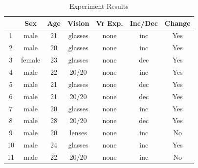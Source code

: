 \documentclass[tog]{acmsiggraph}
\begin{document}
\begin{table}[H]
	\centering
	\caption{Experiment Results}
	\label{The results}
	\begin{tabular}{@{}ccccccc@{}}
		\toprule
		& Sex                         & Age                     & Vision                       & Vr Exp.                   & Inc/Dec                  & Change                   \\ \midrule
		\multicolumn{1}{|c|}{1}  & \multicolumn{1}{c|}{male}   & \multicolumn{1}{c|}{21} & \multicolumn{1}{c|}{glasses} & \multicolumn{1}{c|}{none} & \multicolumn{1}{c|}{inc} & \multicolumn{1}{c|}{Yes} \\ \midrule
		\multicolumn{1}{|c|}{2}  & \multicolumn{1}{c|}{male}   & \multicolumn{1}{c|}{20} & \multicolumn{1}{c|}{glasses} & \multicolumn{1}{c|}{none} & \multicolumn{1}{c|}{inc} & \multicolumn{1}{c|}{Yes} \\ \midrule
		\multicolumn{1}{|c|}{3}  & \multicolumn{1}{c|}{female} & \multicolumn{1}{c|}{23} & \multicolumn{1}{c|}{glasses} & \multicolumn{1}{c|}{none} & \multicolumn{1}{c|}{dec} & \multicolumn{1}{c|}{Yes} \\ \midrule
		\multicolumn{1}{|c|}{4}  & \multicolumn{1}{c|}{male}   & \multicolumn{1}{c|}{22} & \multicolumn{1}{c|}{20/20}   & \multicolumn{1}{c|}{none} & \multicolumn{1}{c|}{inc} & \multicolumn{1}{c|}{Yes} \\ \midrule
		\multicolumn{1}{|c|}{5}  & \multicolumn{1}{c|}{male}   & \multicolumn{1}{c|}{21} & \multicolumn{1}{c|}{glasses} & \multicolumn{1}{c|}{none} & \multicolumn{1}{c|}{dec} & \multicolumn{1}{c|}{Yes} \\ \midrule
		\multicolumn{1}{|c|}{6}  & \multicolumn{1}{c|}{male}   & \multicolumn{1}{c|}{21} & \multicolumn{1}{c|}{20/20}   & \multicolumn{1}{c|}{none} & \multicolumn{1}{c|}{dec} & \multicolumn{1}{c|}{Yes} \\ \midrule
		\multicolumn{1}{|c|}{7}  & \multicolumn{1}{c|}{male}   & \multicolumn{1}{c|}{20} & \multicolumn{1}{c|}{glasses} & \multicolumn{1}{c|}{none} & \multicolumn{1}{c|}{inc} & \multicolumn{1}{c|}{Yes} \\ \midrule
		\multicolumn{1}{|c|}{8}  & \multicolumn{1}{c|}{male}   & \multicolumn{1}{c|}{28} & \multicolumn{1}{c|}{20/20}   & \multicolumn{1}{c|}{none} & \multicolumn{1}{c|}{dec} & \multicolumn{1}{c|}{Yes} \\ \midrule
		\multicolumn{1}{|c|}{9}  & \multicolumn{1}{c|}{male}   & \multicolumn{1}{c|}{20} & \multicolumn{1}{c|}{lenses}  & \multicolumn{1}{c|}{none} & \multicolumn{1}{c|}{inc} & \multicolumn{1}{c|}{No}  \\ \midrule
		\multicolumn{1}{|c|}{10} & \multicolumn{1}{c|}{male}   & \multicolumn{1}{c|}{24} & \multicolumn{1}{c|}{glasses} & \multicolumn{1}{c|}{none} & \multicolumn{1}{c|}{inc} & \multicolumn{1}{c|}{Yes} \\ \midrule
		\multicolumn{1}{|c|}{11} & \multicolumn{1}{c|}{male}   & \multicolumn{1}{c|}{22} & \multicolumn{1}{c|}{20/20}   & \multicolumn{1}{c|}{none} & \multicolumn{1}{c|}{inc} & \multicolumn{1}{c|}{No}  \\ \bottomrule
	\end{tabular}
\end{table}
\end{document}
